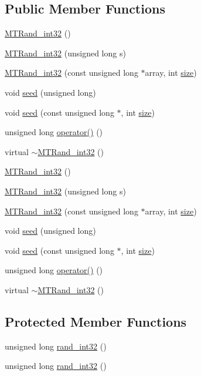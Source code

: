 \subsection*{Public Member Functions}
\begin{DoxyCompactItemize}
\item 
\hyperlink{a00018_a034f223c086f5368bd220b02f2cc12a8}{M\+T\+Rand\+\_\+int32} ()
\item 
\hyperlink{a00018_ad30f7c63a6f1fb3c3b76b8ce6ffa0206}{M\+T\+Rand\+\_\+int32} (unsigned long s)
\item 
\hyperlink{a00018_a19acddb3910a7282517b2ffc398b92b4}{M\+T\+Rand\+\_\+int32} (const unsigned long $\ast$array, int \hyperlink{a00104_ae113ea7f9e515a12ac4b5595c6faf61e}{size})
\item 
void \hyperlink{a00018_a0c57076fe30358e0700a7ce1baa0ea27}{seed} (unsigned long)
\item 
void \hyperlink{a00018_a3cabc1e3445716236a570ffd2f69686d}{seed} (const unsigned long $\ast$, int \hyperlink{a00104_ae113ea7f9e515a12ac4b5595c6faf61e}{size})
\item 
unsigned long \hyperlink{a00018_ad7fe22190d0411c6dac8e6f471633aa4}{operator()} ()
\item 
virtual \hyperlink{a00018_a364900abea0758d070ce89922159923a}{$\sim$\+M\+T\+Rand\+\_\+int32} ()
\item 
\hyperlink{a00018_a034f223c086f5368bd220b02f2cc12a8}{M\+T\+Rand\+\_\+int32} ()
\item 
\hyperlink{a00018_ad30f7c63a6f1fb3c3b76b8ce6ffa0206}{M\+T\+Rand\+\_\+int32} (unsigned long s)
\item 
\hyperlink{a00018_a19acddb3910a7282517b2ffc398b92b4}{M\+T\+Rand\+\_\+int32} (const unsigned long $\ast$array, int \hyperlink{a00104_ae113ea7f9e515a12ac4b5595c6faf61e}{size})
\item 
void \hyperlink{a00018_a0c57076fe30358e0700a7ce1baa0ea27}{seed} (unsigned long)
\item 
void \hyperlink{a00018_a3cabc1e3445716236a570ffd2f69686d}{seed} (const unsigned long $\ast$, int \hyperlink{a00104_ae113ea7f9e515a12ac4b5595c6faf61e}{size})
\item 
unsigned long \hyperlink{a00018_ad7fe22190d0411c6dac8e6f471633aa4}{operator()} ()
\item 
virtual \hyperlink{a00018_a364900abea0758d070ce89922159923a}{$\sim$\+M\+T\+Rand\+\_\+int32} ()
\end{DoxyCompactItemize}
\subsection*{Protected Member Functions}
\begin{DoxyCompactItemize}
\item 
unsigned long \hyperlink{a00018_abacdfa346255baeac69d29bb57f29b22}{rand\+\_\+int32} ()
\item 
unsigned long \hyperlink{a00018_abacdfa346255baeac69d29bb57f29b22}{rand\+\_\+int32} ()
\end{DoxyCompactItemize}


